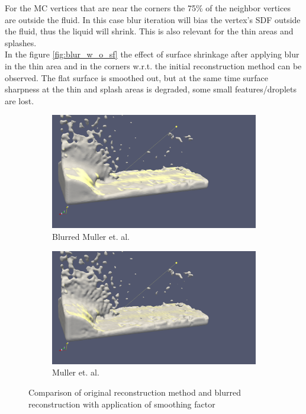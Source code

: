 For the MC vertices that are near the corners the 75\% of the neighbor vertices are outside the fluid. In this case blur iteration will bias the vertex's SDF outside the fluid, thus the liquid will shrink. This is also relevant for the thin areas and splashes.\\
In the figure \ref{fig:blur_w_o_sf} the effect of surface shrinkage after applying blur in the thin area and in the corners w.r.t. the initial reconstruction method can be observed. The flat surface is smoothed out, but at the same time surface sharpness at the thin and splash areas is degraded, some small features/droplets are lost.
\begin{figure}
        \begin{subfigure}[b]{0.5\textwidth}
				\includegraphics[width=\textwidth]{figures/DenvityBasedSplashArea2.png}
				\caption{Blurred Muller et. al.}
				\label{fig:blur_with_sf}
        \end{subfigure}
        \begin{subfigure}[b]{0.5\textwidth}
               \includegraphics[width=\textwidth]{figures/DenvityBlurredSplashArea2.png}
               \caption{Muller et. al.}
               \label{fig:db_rec}
        \end{subfigure}
       \caption{Comparison of original reconstruction method and blurred reconstruction with application of smoothing factor}
       \label{fig:blur_thin_area_with_sf}
 \end{figure}
